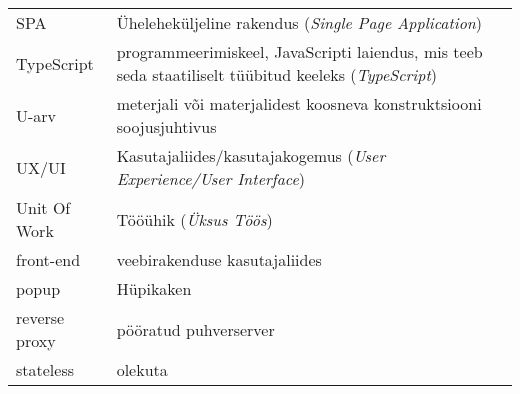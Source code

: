 \begin{longtable}{p{3cm}p{10cm}}
SPA&Üheleheküljeline rakendus (\emph{Single Page Application})\\
TypeScript&programmeerimiskeel, JavaScripti laiendus, mis teeb seda staatiliselt tüübitud keeleks (\emph{TypeScript})\\
U-arv&meterjali või materjalidest koosneva konstruktsiooni soojusjuhtivus\\
UX/UI&Kasutajaliides/kasutajakogemus (\emph{User Experience/User Interface})\\
Unit Of Work&Tööühik (\emph{Üksus Töös})\\
front-end&veebirakenduse kasutajaliides\\
popup&Hüpikaken\\
reverse proxy&pööratud puhverserver\\
stateless&olekuta\\
\end{longtable}
\addtocounter{table}{-1} 